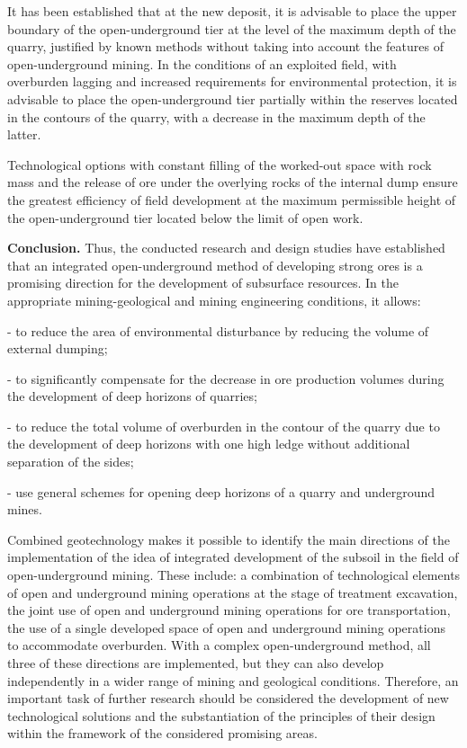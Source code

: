 \begin{multicols}{2}
It has been established that at the new deposit, it is advisable to
place the upper boundary of the open-underground tier at the level of
the maximum depth of the quarry, justified by known methods without
taking into account the features of open-underground mining. In the
conditions of an exploited field, with overburden lagging and increased
requirements for environmental protection, it is advisable to place the
open-underground tier partially within the reserves located in the
contours of the quarry, with a decrease in the maximum depth of the
latter.

Technological options with constant filling of the worked-out space with
rock mass and the release of ore under the overlying rocks of the
internal dump ensure the greatest efficiency of field development at the
maximum permissible height of the open-underground tier located below
the limit of open work.

{\bfseries Conclusion.} Thus, the conducted research and design studies
have established that an integrated open-underground method of
developing strong ores is a promising direction for the development of
subsurface resources. In the appropriate mining-geological and mining
engineering conditions, it allows:

- to reduce the area of environmental disturbance by reducing the volume
of external dumping;

- to significantly compensate for the decrease in ore production volumes
during the development of deep horizons of quarries;

- to reduce the total volume of overburden in the contour of the quarry
due to the development of deep horizons with one high ledge without
additional separation of the sides;

- use general schemes for opening deep horizons of a quarry and
underground mines.

Combined geotechnology makes it possible to identify the main directions
of the implementation of the idea of integrated development of the
subsoil in the field of open-underground mining. These include: a
combination of technological elements of open and underground mining
operations at the stage of treatment excavation, the joint use of open
and underground mining operations for ore transportation, the use of a
single developed space of open and underground mining operations to
accommodate overburden. With a complex open-underground method, all
three of these directions are implemented, but they can also develop
independently in a wider range of mining and geological conditions.
Therefore, an important task of further research should be considered
the development of new technological solutions and the substantiation of
the principles of their design within the framework of the considered
promising areas.
\end{multicols}

